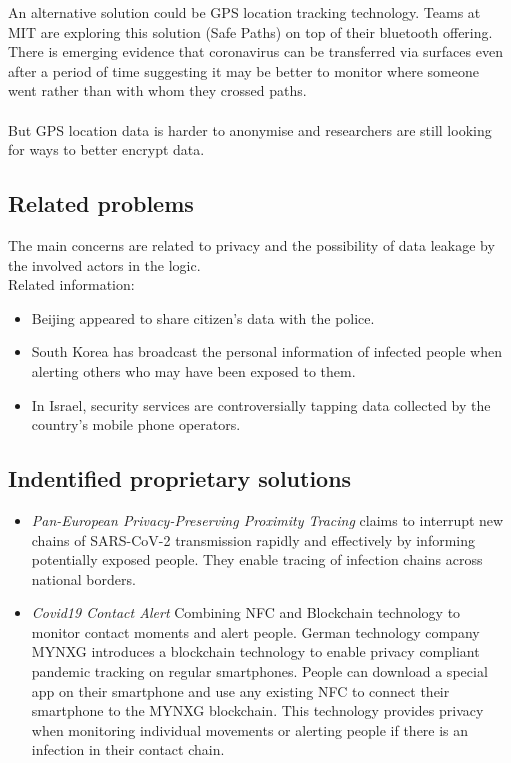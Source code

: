 An alternative solution could be GPS location tracking technology. Teams at MIT are exploring this solution (Safe Paths) on top of their bluetooth offering. There is emerging evidence that coronavirus can be transferred via surfaces even after a period of time suggesting it may be better to monitor where someone went rather than with whom they crossed paths.\\
\\
But GPS location data is harder to anonymise and researchers are still looking for ways to better encrypt data.
\\
{\color{PineGreen}\subsection{Related problems}}
The main concerns are related to privacy and the possibility of data leakage by the involved actors in the logic.\\
Related information:
\begin{itemize}
\item Beijing appeared to share citizen's data with the police.
\item South Korea has broadcast the personal information of infected people when alerting others who may have been exposed to them.
\item In Israel, security services are controversially tapping data collected by the country's mobile phone operators.
\end{itemize}

{\color{PineGreen}\subsection{Indentified proprietary solutions}}
\begin{itemize}
\item \textit{Pan-European Privacy-Preserving Proximity Tracing}\cite{bib4} claims to interrupt new chains of SARS-CoV-2 transmission rapidly and effectively by informing potentially exposed people. They enable tracing of infection chains across national borders. 
\item \textit{Covid19 Contact Alert} Combining NFC and Blockchain technology to monitor contact moments and alert people. German technology company MYNXG\cite{bib5} introduces a blockchain technology to enable privacy compliant pandemic tracking on regular smartphones. People can download a special app on their smartphone and use any existing NFC to connect their smartphone to the MYNXG blockchain. This technology provides privacy when monitoring individual movements or alerting people if there is an infection in their contact chain. 
\end{itemize}


